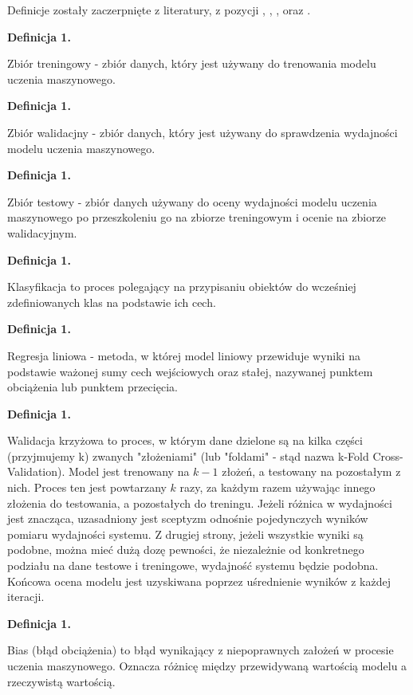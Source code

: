 Definicje zostały zaczerpnięte z literatury, z pozycji \cite{Fenner2020}, \cite{Geron2020},
\cite{Seenappa} , \cite{Goodfellow2016} oraz \cite{vanDerMaaten}.

\newcommand{\mlDefinitionIndex}{1}
\newcommand{\incrementMlDefinitionIndex} {
    \pgfmathtruncatemacro{\mlDefinitionIndex}{\mlDefinitionIndex + 1}
}

\noindent
\textbf{Definicja \mlDefinitionIndex.}
\incrementMlDefinitionIndex
Zbiór treningowy - zbiór danych, który jest używany do trenowania modelu uczenia maszynowego.

\noindent
\textbf{Definicja \mlDefinitionIndex.}
\incrementMlDefinitionIndex
Zbiór walidacjny - zbiór danych, który jest używany do sprawdzenia wydajności modelu uczenia maszynowego.

\noindent
\textbf{Definicja \mlDefinitionIndex.}
\incrementMlDefinitionIndex
Zbiór testowy - zbiór danych używany do oceny wydajności modelu uczenia maszynowego
po przeszkoleniu go na zbiorze treningowym i ocenie na zbiorze walidacyjnym.

\noindent
\textbf{Definicja \mlDefinitionIndex.}
\incrementMlDefinitionIndex
Klasyfikacja to proces polegający na przypisaniu obiektów do wcześniej zdefiniowanych klas na podstawie ich cech.

\noindent
\textbf{Definicja \mlDefinitionIndex.}
\incrementMlDefinitionIndex
Regresja liniowa - metoda, w której model liniowy przewiduje wyniki na podstawie ważonej sumy cech wejściowych oraz stałej,
nazywanej punktem obciążenia lub punktem przecięcia.

\noindent
\textbf{Definicja \mlDefinitionIndex.}
\incrementMlDefinitionIndex
Walidacja krzyżowa to proces, w którym dane dzielone są na kilka części (przyjmujemy k) zwanych "złożeniami"
(lub "foldami" - stąd nazwa k-Fold Cross-Validation). Model jest trenowany na $k-1$ złożeń, a testowany na pozostałym z nich.
Proces ten jest powtarzany $k$ razy, za każdym razem używając innego złożenia do testowania, a pozostałych do treningu.
Jeżeli różnica w wydajności jest znacząca, uzasadniony jest sceptyzm odnośnie pojedynczych wyników pomiaru wydajności systemu.
Z drugiej strony, jeżeli wszystkie wyniki są podobne, można mieć dużą dozę pewności, że niezależnie od konkretnego podziału
na dane testowe i treningowe, wydajność systemu będzie podobna.
Końcowa ocena modelu jest uzyskiwana poprzez uśrednienie wyników z każdej iteracji.

\noindent
\textbf{Definicja \mlDefinitionIndex.}
\incrementMlDefinitionIndex
Bias (błąd obciążenia) to błąd wynikający z niepoprawnych założeń w procesie uczenia maszynowego.
Oznacza różnicę między przewidywaną wartością modelu a rzeczywistą wartością.

